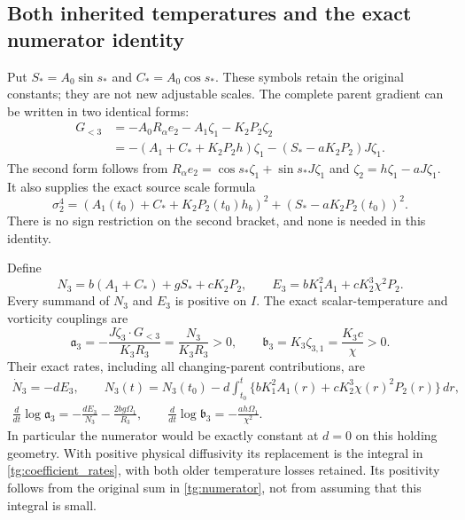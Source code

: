 \subsection{Both inherited temperatures and the exact numerator identity}

Put $S_*=A_0\sin s_*$ and $C_*=A_0\cos s_*$. These symbols
retain the original constants; they are not new adjustable scales.
The complete parent gradient can be written in two identical forms:
\begin{equation}\label{tg:gradient}
\begin{aligned}
 G_{<3}&=-A_0R_\alpha e_2-A_1\zeta_1-K_2P_2\zeta_2\\
       &=-(A_1+C_*+K_2P_2h)\zeta_1
                   -(S_*-aK_2P_2)J\zeta_1.
\end{aligned}
\end{equation}
The second form follows from
$R_\alpha e_2=\cos s_*\zeta_1+\sin s_*J\zeta_1$ and
$\zeta_2=h\zeta_1-aJ\zeta_1$. It also supplies the exact
source scale formula
\begin{equation}\label{tg:scale}
 \sigma_2^4=
  (A_1(t_0)+C_*+K_2P_2(t_0)h_b)^2
  +(S_*-aK_2P_2(t_0))^2.
\end{equation}
There is no sign restriction on the second bracket, and none is
needed in this identity.

Define
\begin{equation}\label{tg:numerator}
 N_3=b(A_1+C_*)+gS_*+cK_2P_2,\qquad
 E_3=bK_1^2A_1+cK_2^3\chi^2P_2.
\end{equation}
Every summand of $N_3$ and $E_3$ is positive on $I$.
The exact scalar-temperature and vorticity couplings are
\begin{equation}\label{tg:couplings}
 \mathfrak a_3=-\frac{J\zeta_3\cdot G_{<3}}{K_3R_3}
              =\frac{N_3}{K_3R_3}>0,
 \qquad
 \mathfrak b_3=K_3\zeta_{3,1}=\frac{K_3c}{\chi}>0.
\end{equation}
Their exact rates, including all changing-parent contributions, are
\begin{equation}\label{tg:coefficient_rates}
\begin{gathered}
 \dot N_3=-dE_3,\qquad
 N_3(t)=N_3(t_0)-d\int_{t_0}^t
       \{bK_1^2A_1(r)+cK_2^3\chi(r)^2P_2(r)\}\,dr,\\
 \frac{d}{dt}\log\mathfrak a_3
       =-\frac{dE_3}{N_3}-\frac{2bg\Omega_1}{R_3},\qquad
 \frac{d}{dt}\log\mathfrak b_3
       =-\frac{ah\Omega_1}{\chi^2}.
\end{gathered}
\end{equation}
In particular the numerator would be exactly constant at $d=0$
on this holding geometry. With positive physical diffusivity its
replacement is the integral in \eqref{tg:coefficient_rates}, with
both older temperature losses retained. Its positivity follows from
the original sum in \eqref{tg:numerator}, not from assuming that this
integral is small.

